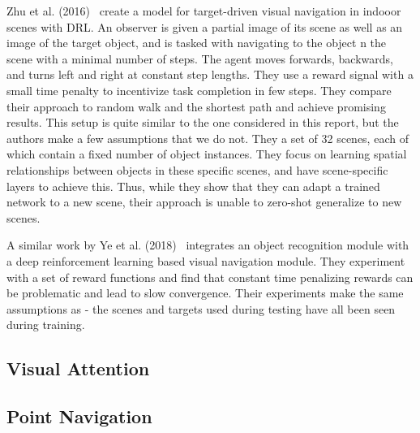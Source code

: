 Zhu et al. (2016)~\cite{zhu_target_driven_2016} create a model for target-driven visual navigation in indooor scenes with DRL.
An observer is given a partial image of its scene as well as an image of the target object, and is tasked with navigating to the object n the scene with a minimal number of steps.
The agent moves forwards, backwards, and turns left and right at constant step lengths.
They use a reward signal with a small time penalty to incentivize task completion in few steps.
They compare their approach to random walk and the shortest path and achieve promising results.
This setup is quite similar to the one considered in this report, but the authors make a few assumptions that we do not.
They a set of 32 scenes, each of which contain a fixed number of object instances.
They focus on learning spatial relationships between objects in these specific scenes, and have scene-specific layers to achieve this.
Thus, while they show that they can adapt a trained network to a new scene, their approach is unable to zero-shot generalize to new scenes.

A similar work by Ye et al. (2018)~\cite{ye_active_2018} integrates an object recognition module with a deep reinforcement learning based visual navigation module.
They experiment with a set of reward functions and find that constant time penalizing rewards can be problematic and lead to slow convergence.
Their experiments make the same assumptions as \cite{zhu_target_driven} - the scenes and targets used during testing have all been seen during training.





\subsection{Visual Attention}


\subsection{Point Navigation}



